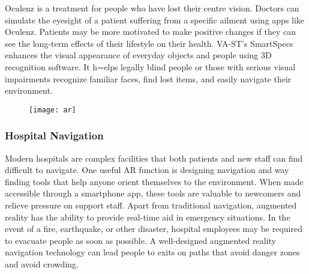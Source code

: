 \documentclass[12pt]{article}
\begin{document}
Oculenz is a treatment for people who have lost their centre vision. Doctors can simulate the eyesight of a patient suffering from a specific ailment using apps like Oculenz. Patients may be more motivated to make positive changes if they can see the long-term effects of their lifestyle on their health.
                                       VA-ST’s SmartSpecs enhances the visual appearance of everyday objects and people using 3D recognition software. It h=elps legally blind people or those with serious visual impairments recognize familiar faces, find lost items, and easily navigate their environment.
                                       
\begin{figure}[h]
\centering
\texttt{[image: ar]}
\end{figure}                                       
\subsubsection{Hospital Navigation}
Modern hospitals are complex facilities that both patients and new staff can find difficult to navigate. One useful AR function is designing navigation and way finding tools that help anyone orient themselves to the environment. When made accessible through a smartphone app, these tools are valuable to newcomers and relieve pressure on support staff. 
                                 Apart from traditional navigation, augmented reality has the ability to provide real-time aid in emergency situations. In the event of a fire, earthquake, or other disaster, hospital employees may be required to evacuate people as soon as possible. A well-designed augmented reality navigation technology can lead people to exits on paths that avoid danger zones and avoid crowding.
\end{document}

